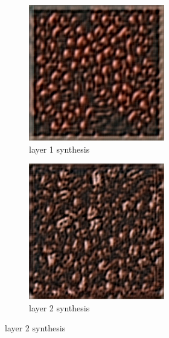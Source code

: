 \documentclass[11pt, oneside]{article}   	%
\begin{document}
\begin{figure}[H]
    \centering
    \begin{subfigure}[b]{0.45\textwidth}
        \includegraphics[width=\textwidth]{figure/coffee/layer_01_001}
        \caption{layer 1 synthesis}
    \end{subfigure}
    \begin{subfigure}[b]{0.45\textwidth}
        \includegraphics[width=\textwidth]{figure/coffee/layer_02_001}
        \caption{layer 2 synthesis}
    \end{subfigure}
    

\end{figure}
\end{document}
